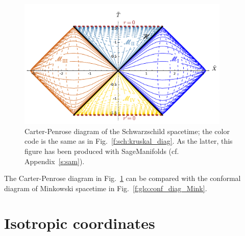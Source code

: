 \begin{figure}
\centerline{\includegraphics[width=0.9\textwidth]{sch_carter-penrose.pdf}}
\caption[]{\label{f:sch:sch_carter-penrose} \footnotesize
Carter-Penrose diagram of the Schwarzschild spacetime; the color code
is the same as in Fig.~\ref{f:sch:kruskal_diag}.
As the latter, this figure has been produced with
SageManifolds (cf. Appendix~\ref{s:sam}).}
\end{figure}

The Carter-Penrose diagram in Fig.~\ref{f:sch:sch_carter-penrose} can be compared with the conformal diagram
of Minkowski spacetime in Fig.~\ref{f:glo:conf_diag_Mink}.


\cite{HalacL14}

\section{Isotropic coordinates}


